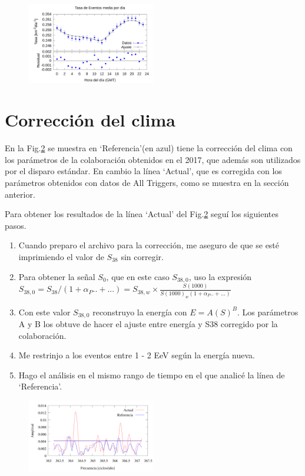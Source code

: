 \begin{figure}[H]
    \begin{small}
        \begin{center}
            \includegraphics[width=0.5\textwidth]{rate_hourly.pdf}
        \end{center}
        \caption{}
        \label{fig:hora}
    \end{small}
\end{figure}


\section*{Corrección del clima}

En la Fig.\ref{fig:label} se muestra en `Referencia'(en azul) tiene la corrección del clima con los parámetros de la colaboración obtenidos en el 2017, que además son utilizados por el disparo estándar. En cambio la línea `Actual', que es corregida con los parámetros  obtenidos con datos de All Triggers, como se muestra en la sección anterior. 

Para obtener los resultados de la línea `Actual' del Fig.\ref{fig:label} seguí los siguientes pasos.

\begin{enumerate}
\item Cuando preparo el archivo para la corrección, me aseguro de que se esté imprimiendo el valor de $S_{38}$ sin corregir.
\item Para obtener la señal $S_0$, que en este caso $S_{38,0}$, uso la expresión $S_{38,0} = S_{38}/(1 + \alpha_P..+ ...) = S_{38,w}\times \frac{S(1000)}{S(1000)_w (1 + \alpha_P..+ ...)  }$  
\item Con este valor $S_{38,0}$ reconstruyo la energía con $E=A (S)^B$. Los parámetros A y B los obtuve de hacer el ajuste entre energía y S38 corregido por la colaboración. 
\item Me restrinjo a los eventos entre 1 - 2 EeV según la energía nueva.
\item Hago el análisis en el mismo rango de tiempo en el que analicé la línea de `Referencia'. 
\end{enumerate}


\begin{figure}[H]
    \begin{small}
        \begin{center}
            \includegraphics[width=0.5\textwidth]{anisotropia.pdf}
        \end{center}
        \caption{}
        \label{fig:label}
    \end{small}
\end{figure}

